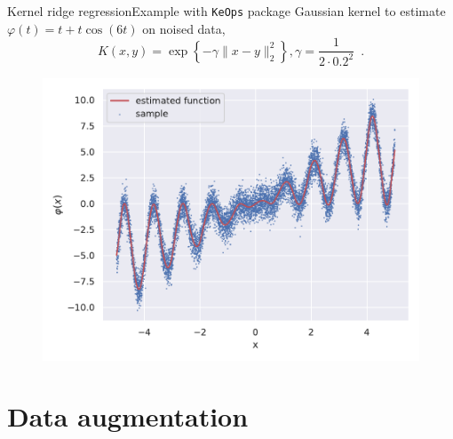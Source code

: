 \documentclass[10pt,aspectratio=43]{beamer}
\begin{document}
\begin{frame}{Kernel ridge regression}{Example with \texttt{KeOps} package}
    Gaussian kernel to estimate $\varphi(t) = t + t\cos(6t)$ on noised data,
\[K(x,y)=\exp\left\{-\gamma\|x - y\|^2_2\right\}, \gamma=\frac{1}{2\cdot 0.2^2} \enspace.\]
\begin{figure}
    \centering
    \includegraphics[scale=.45]{KRR.pdf}
\end{figure}
\end{frame}


\section{Data augmentation}
\end{document}
